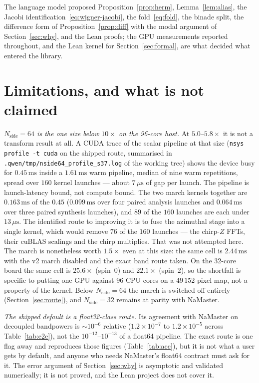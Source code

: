 \documentclass[usenatbib,useAMS]{mnras}
\begin{document}
The language model proposed Proposition~\ref{prop:herm}, Lemma~\ref{lem:alias}, the Jacobi identification~\eqref{eq:wigner-jacobi}, the fold~\eqref{eq:fold}, the binade split, the difference form of Proposition~\ref{prop:diff} with the modal argument of Section~\ref{sec:why}, and the Lean proofs; the GPU measurements reported throughout, and the Lean kernel for Section~\ref{sec:formal}, are what decided what entered the library.

\section{Limitations, and what is not claimed}
\label{sec:lim}

\textit{$N_{\mathrm{side}}=64$ is the one size below $10\times$ on the 96-core host.} At $5.0$--$5.8\times$ it is not a transform result at all. A CUDA trace of the scalar pipeline at that size (\texttt{nsys profile -t cuda} on the shipped route, summarised in \texttt{.qwen/tmp/nside64\_profile\_s37.log} of the working tree) shows the device busy for $0.45\,\mathrm{ms}$ inside a $1.61\,\mathrm{ms}$ warm pipeline, median of nine warm repetitions, spread over $160$ kernel launches --- about $7\,\mu\mathrm{s}$ of gap per launch. The pipeline is launch-latency bound, not compute bound. The two march kernels together are $0.163\,\mathrm{ms}$ of the $0.45$ ($0.099\,\mathrm{ms}$ over four paired analysis launches and $0.064\,\mathrm{ms}$ over three paired synthesis launches), and $89$ of the $160$ launches are each under $13\,\mu\mathrm{s}$. The identified route to improving it is to fuse the azimuthal stage into a single kernel, which would remove $76$ of the $160$ launches --- the chirp-$Z$ FFTs, their cuBLAS scalings and the chirp multiplies. That was not attempted here. The march is nonetheless worth $1.5\times$ even at this size: the same cell is $2.44\,\mathrm{ms}$ with the v2 march disabled and the exact band route taken. On the 32-core board the same cell is $25.6\times$ (spin~$0$) and $22.1\times$ (spin~$2$), so the shortfall is specific to putting one GPU against 96 CPU cores on a $49\,152$-pixel map, not a property of the kernel. Below $N_{\mathrm{side}}=64$ the march is switched off entirely (Section~\ref{sec:route}), and $N_{\mathrm{side}}=32$ remains at parity with NaMaster.

\textit{The shipped default is a float32-class route.} Its agreement with NaMaster on decoupled bandpowers is $\sim10^{-6}$ relative ($1.2\times10^{-7}$ to $1.2\times10^{-5}$ across Table~\ref{tab:e2e}), not the $10^{-12}$--$10^{-13}$ of a float64 pipeline. The exact route is one flag away and reproduces those figures (Table~\ref{tab:acc}), but it is not what a user gets by default, and anyone who needs NaMaster's float64 contract must ask for it. The error argument of Section~\ref{sec:why} is asymptotic and validated numerically; it is not proved, and the Lean project does not cover it.
\end{document}
